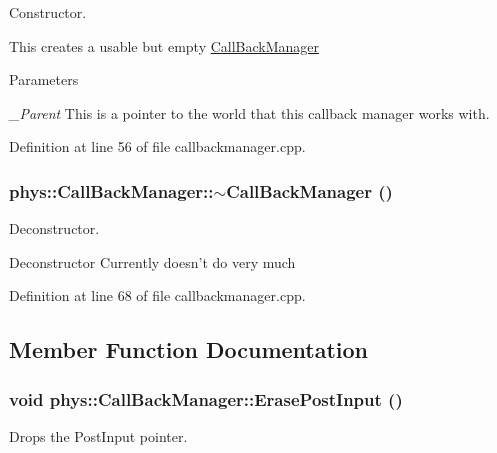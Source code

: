 Constructor. 

This creates a usable but empty \hyperlink{classphys_1_1CallBackManager}{CallBackManager} 
\begin{DoxyParams}{Parameters}
\item[{\em \_\-Parent}]This is a pointer to the world that this callback manager works with. \end{DoxyParams}


Definition at line 56 of file callbackmanager.cpp.

\hypertarget{classphys_1_1CallBackManager_a098b7a7822538aa6d6c4ba690f1e069d}{
\subsubsection[{$\sim$CallBackManager}]{\setlength{\rightskip}{0pt plus 5cm}phys::CallBackManager::$\sim$CallBackManager ()}}
\label{d1/d47/classphys_1_1CallBackManager_a098b7a7822538aa6d6c4ba690f1e069d}


Deconstructor. 

Deconstructor Currently doesn't do very much 

Definition at line 68 of file callbackmanager.cpp.



\subsection{Member Function Documentation}
\hypertarget{classphys_1_1CallBackManager_a84ccf382be58b42439869ec9b77a0f89}{
\subsubsection[{ErasePostInput}]{\setlength{\rightskip}{0pt plus 5cm}void phys::CallBackManager::ErasePostInput ()}}
\label{d1/d47/classphys_1_1CallBackManager_a84ccf382be58b42439869ec9b77a0f89}


Drops the PostInput pointer. 

